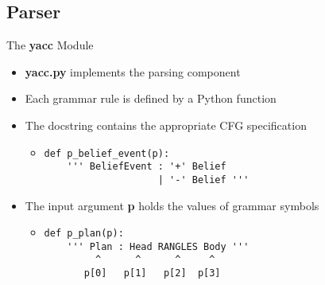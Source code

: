 \subsection{Parser}
\begin{frame}[fragile]{The \textbf{yacc} Module}
  \begin{itemize}
    \item \textbf{yacc.py} implements the parsing component
\N
    \item Each grammar rule is defined by a Python function
\n
    \item The docstring contains the appropriate CFG specification
\n
    \begin{itemize}
     \item 
      \begin{verbatim} 
def p_belief_event(p):
    ''' BeliefEvent : '+' Belief 
                    | '-' Belief ''' \end{verbatim}
    \end{itemize}
\n
    \item The input argument \textbf{p} holds the values of grammar symbols
\n
    \begin{itemize}
      \item 
      \begin{verbatim} 
def p_plan(p):
    ''' Plan : Head RANGLES Body ''' 
         ^      ^      ^     ^
       p[0]   p[1]   p[2]  p[3] \end{verbatim}
    \end{itemize}
  \end{itemize}
%
\N\N
\end{frame}


